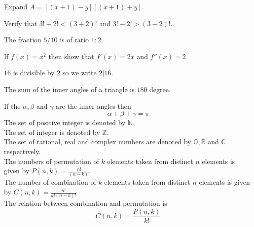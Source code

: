 \documentclass[12pt,a4paper]{article}
\begin{document}
	Expand $ A=[(x+1)-y][(x+1)+y] $.
	\par
	Verify that $ 3!+2!<(3+2)! $ and $ 3!-2!>(3-2)! $.
	\par
	The fraction $ 5/10 $ is of ratio $ 1:2 $.
	\par
	If $ f(x)=x^2 $ then show that $ f'(x)=2x $ and $ f''(x)=2 $
	\par $ 16 $ is divisible by $ 2 $ so we write $ 2|16 $.
	\par
	The sum of the inner angles of a triangle is $ 180 $ degree.
	\newline\par
	If the $ \alpha,\beta $ and $ \gamma $ are the inner angles then
	\[ \alpha+\beta+\gamma=\pi \]
	\newline
	The set of positive integer is denoted by $ \mathbb{N} $. \\
	The set of integer is denoted by $ \mathbb{Z} $. \\
	The set of rational, real and complex numbers are denoted by $ \mathbb{Q},\mathbb{R} $ and $ \mathbb{C} $ respectively.\\ [1cm]
	The numbers of permutation of $ k $ elements taken from distinct $ n $
	elements is given by $ P(n,k)=\frac{n!}{(n-k)!} $ \\
	The number of combination of $ k $ elements taken from distinct $ n $
	elements is given by $ C(n,k)=\frac{n!}{k!(n-k)!} $ \\[1cm]
	The relation between combination and permutation is
	\begin{equation}
	C(n,k)=\frac{P(n,k)}{k!}
	\end{equation}
\end{document}
